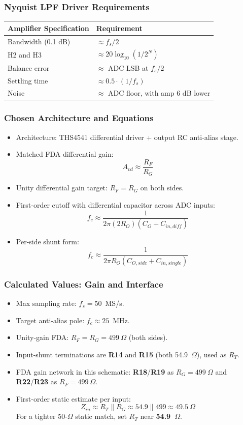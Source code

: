 \begin{frame}
  \frametitle{Nyquist LPF Driver Requirements}
  \small
  \begin{tabular}{|p{}|p{}|}
    \hline
    \textbf{Amplifier Specification} & \textbf{Requirement} \\
    \hline
    Bandwidth (0.1 dB) & $\approx f_s/2$ \\
    \hline
    H2 and H3 & $\approx 20\log_{10}(1/2^N)$ \\
    \hline
    Balance error & $\approx$ ADC LSB at $f_s/2$ \\
    \hline
    Settling time & $\approx 0.5\cdot(1/f_s)$ \\
    \hline
    Noise & $\approx$ ADC floor, with amp 6 dB lower \\
    \hline
  \end{tabular}
\end{frame}

\begin{frame}
  \frametitle{Chosen Architecture and Equations}
  \begin{itemize}
    \item Architecture: THS4541 differential driver + output RC anti-alias stage.
    \item Matched FDA differential gain:
    \[
      A_{vd} \approx \frac{R_F}{R_G}
    \]
    \item Unity differential gain target: $R_F=R_G$ on both sides.
    \item First-order cutoff with differential capacitor across ADC inputs:
    \[
      f_c \approx \frac{1}{2\pi(2R_O)\left(C_O+C_{in,diff}\right)}
    \]
    \item Per-side shunt form:
    \[
      f_c \approx \frac{1}{2\pi R_O\left(C_{O,side}+C_{in,single}\right)}
    \]
  \end{itemize}
\end{frame}

\begin{frame}
  \frametitle{Calculated Values: Gain and Interface}
  \begin{itemize}
    \item Max sampling rate: $f_s=50$~MS/s.
    \item Target anti-alias pole: $f_c\approx25$~MHz.
    \item Unity-gain FDA: $R_F=R_G=499~\Omega$ (both sides).
    \item Input-shunt terminations are \textbf{R14} and \textbf{R15} (both 54.9~$\Omega$), used as $R_T$.
    \item FDA gain network in this schematic: \textbf{R18}/\textbf{R19} as $R_G=499~\Omega$ and \textbf{R22}/\textbf{R23} as $R_F=499~\Omega$.
    \item First-order static estimate per input:
    \[
      Z_{in}\approx R_T\parallel R_G \approx 54.9\parallel 499 \approx 49.5~\Omega
    \]
    For a tighter 50-$\Omega$ static match, set $R_T$ near \textbf{54.9~$\Omega$}.
  \end{itemize}
\end{frame}

